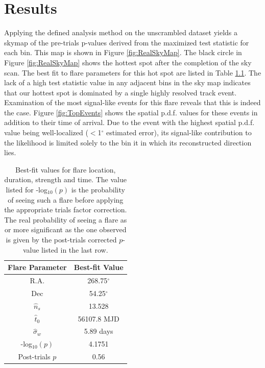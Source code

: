 \documentclass{gatech-thesis}
\begin{document}
\chapter{Results}
Applying the defined analysis method on the unscrambled dataset yields a skymap of the pre-trials p-values derived from the maximized test statistic for each bin. This map is shown in Figure \ref{fig:RealSkyMap}. The black circle in Figure \ref{fig:RealSkyMap} shows the hottest spot after the completion of the sky scan. The best fit to flare parameters for this hot spot are listed in Table \ref{tab:best_fit_flare}. The lack of a high test statistic value in any adjacent bins in the sky map indicates that our hottest spot is dominated by a single highly resolved track event. Examination of the most signal-like events for this flare reveals that this is indeed the case. Figure \ref{fig:TopEvents} shows the spatial p.d.f. values for these events in addition to their time of arrival. Due to the event with the highest spatial p.d.f. value being well-localized ($<$1$^{\circ}$ estimated error), its signal-like contribution to the likelihood is limited solely to the bin it in which its reconstructed direction lies.

\begin{table}[h]
\caption[Best-fit signal parameters]{Best-fit values for flare location, duration, strength and time. The value listed for -log$_{10}(p)$ is the probability of seeing such a flare before applying the appropriate trials factor correction. The real probability of seeing a flare as or more significant as the one observed is given by the post-trials corrected $p$-value listed in the last row.\label{tab:best_fit_flare}}
\begin{center}
\begin{tabular}{cc}
  \toprule
 \textbf{Flare Parameter} &\textbf{ Best-fit Value} \\
\midrule
R.A. & 268.75$^{\circ}$ \\ 
Dec & 54.25$^{\circ}$ \\ 
$\hat{n}_s$ & 13.528 \\ 
$\hat{t}_0$ & 56107.8 MJD \\ 
$\hat{\sigma}_w$ & 5.89 days \\ 
-log$_{10}(p)$ & 4.1751 \\
Post-trials $p$ & 0.56 \\
\end{tabular}
\end{center}
\end{table}
\end{document}

